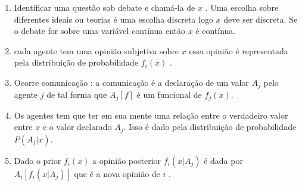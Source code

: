 \begin{enumerate}
\item Identificar uma questão sob debate e chamá-la de $x$ . Uma
  escolha sobre diferentes ideais ou teorias é uma escolha discreta
  logo $x$ deve ser discreta. Se o debate for sobre uma variável
  contínua então $x$ é contínua.
\item cada agente tem uma opinião subjetiva sobre $x$ essa opinião é
  representada pela distribuição de probabilidade $f_i(x)$ .
\item Ocorre comunicação : a comunicação é a declaração de um valor
  $ A_j$ pelo agente $j$ de tal forma que $A_j[f]$ é um funcional de
  $f_j(x)$.
\item Os agentes tem que ter em sua mente  uma relação entre o
  verdadeiro valor entre $x$ e o valor declarado $A_j$. Isso é dado
  pela distribuição de probabilidade $P(A_j|x)$.
\item Dado o prior $f_i(x)$ a opinião posterior $f_i(x|A_j)$ é dada
  por $A_i[f_i(x|A_j)]$ que é a nova opinião de $i$ .
\end{enumerate}
